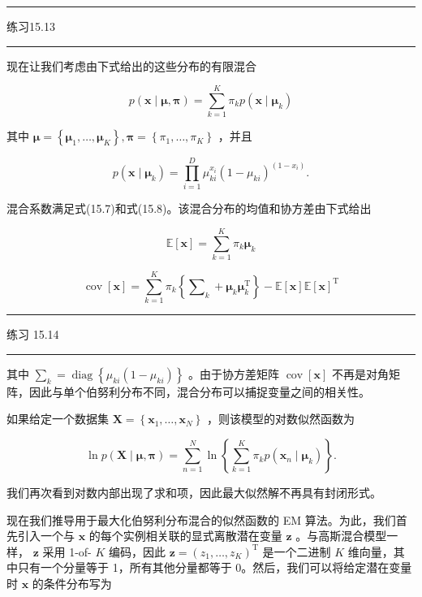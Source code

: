 \documentclass[10pt]{article}
\newcommand{\HRule}{\begin{center}\rule{0.9\linewidth}{0.2mm}\end{center}}
\begin{document}
\HRule

练习15.13

\HRule

现在让我们考虑由下式给出的这些分布的有限混合

\[
p\left( {\mathbf{x} \mid  \mathbf{\mu },\mathbf{\pi }}\right)  = \mathop{\sum }\limits_{{k = 1}}^{K}{\pi }_{k}p\left( {\mathbf{x} \mid  {\mathbf{\mu }}_{k}}\right)  \tag{15.37}
\]

其中 \(\mathbf{\mu } = \left\{  {{\mathbf{\mu }}_{1},\ldots ,{\mathbf{\mu }}_{K}}\right\}  ,\mathbf{\pi } = \left\{  {{\pi }_{1},\ldots ,{\pi }_{K}}\right\}\) ，并且

\[
p\left( {\mathbf{x} \mid  {\mathbf{\mu }}_{k}}\right)  = \mathop{\prod }\limits_{{i = 1}}^{D}{\mu }_{ki}^{{x}_{i}}{\left( 1 - {\mu }_{ki}\right) }^{\left( 1 - {x}_{i}\right) }. \tag{15.38}
\]

混合系数满足式(15.7)和式(15.8)。该混合分布的均值和协方差由下式给出

\[
\mathbb{E}\left\lbrack  \mathbf{x}\right\rbrack   = \mathop{\sum }\limits_{{k = 1}}^{K}{\pi }_{k}{\mathbf{\mu }}_{k} \tag{15.39}
\]

\[
\operatorname{cov}\left\lbrack  \mathbf{x}\right\rbrack   = \mathop{\sum }\limits_{{k = 1}}^{K}{\pi }_{k}\left\{  {{\mathbf{\sum }}_{k} + {\mathbf{\mu }}_{k}{\mathbf{\mu }}_{k}^{\mathrm{T}}}\right\}   - \mathbb{E}\left\lbrack  \mathbf{x}\right\rbrack  \mathbb{E}{\left\lbrack  \mathbf{x}\right\rbrack  }^{\mathrm{T}} \tag{15.40}
\]

\HRule

练习 15.14

\HRule

其中 \({\mathbf{\sum }}_{k} = \operatorname{diag}\left\{  {{\mu }_{ki}\left( {1 - {\mu }_{ki}}\right) }\right\}\) 。由于协方差矩阵 \(\operatorname{cov}\left\lbrack  \mathbf{x}\right\rbrack\) 不再是对角矩阵，因此与单个伯努利分布不同，混合分布可以捕捉变量之间的相关性。

如果给定一个数据集 \(\mathbf{X} = \left\{  {{\mathbf{x}}_{1},\ldots ,{\mathbf{x}}_{N}}\right\}\) ，则该模型的对数似然函数为

\[
\ln p\left( {\mathbf{X} \mid  \mathbf{\mu },\mathbf{\pi }}\right)  = \mathop{\sum }\limits_{{n = 1}}^{N}\ln \left\{  {\mathop{\sum }\limits_{{k = 1}}^{K}{\pi }_{k}p\left( {{\mathbf{x}}_{n} \mid  {\mathbf{\mu }}_{k}}\right) }\right\}  . \tag{15.41}
\]

我们再次看到对数内部出现了求和项，因此最大似然解不再具有封闭形式。

现在我们推导用于最大化伯努利分布混合的似然函数的 EM 算法。为此，我们首先引入一个与 \(\mathbf{x}\) 的每个实例相关联的显式离散潜在变量 \(\mathbf{z}\) 。与高斯混合模型一样， \(\mathbf{z}\) 采用 1-of- \(K\) 编码，因此 \(\mathbf{z} = {\left( {z}_{1},\ldots ,{z}_{K}\right) }^{\mathrm{T}}\) 是一个二进制 \(K\) 维向量，其中只有一个分量等于 1，所有其他分量都等于 0。然后，我们可以将给定潜在变量时 \(\mathbf{x}\) 的条件分布写为
\end{document}
